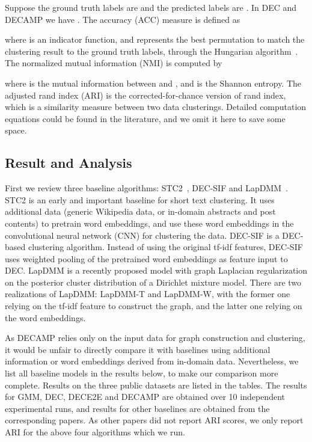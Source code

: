 \documentclass[letterpaper]{article}
\begin{document}
Suppose the ground truth labels are  and the predicted labels are . In DEC and DECAMP we have . The accuracy (ACC) measure is defined as

where  is an indicator function, and  represents the best  permutation to match the clustering result to the ground truth labels, through the Hungarian algorithm~\cite{papadi}. The normalized mutual information (NMI) is computed by

where  is the mutual information between  and , and  is the Shannon entropy. The adjusted rand index (ARI) is the corrected-for-chance version of rand index, which is a similarity measure between two data clusterings. Detailed computation equations could be found in the literature, and we omit it here to save some space. 

\subsection{Result and Analysis}
First we review three baseline algorithms: STC2~\cite{stc2}, DEC-SIF\cite{acl} and LapDMM~\cite{lapdmm}. STC2 is an early and important baseline for short text clustering. It uses additional data (generic Wikipedia data, or in-domain abstracts and post contents) to pretrain word embeddings, and use these word embeddings in the convolutional neural network (CNN) for clustering the data. DEC-SIF is a DEC-based clustering algorithm. Instead of using the original tf-idf features, DEC-SIF uses weighted pooling of the pretrained word embeddings as feature input to DEC. LapDMM is a recently proposed model with graph Laplacian regularization on the posterior cluster distribution of a Dirichlet mixture model. There are two realizations of LapDMM: LapDMM-T and LapDMM-W, with the former one relying on the tf-idf feature to construct the graph, and the latter one relying on the word embeddings.

As DECAMP relies only on the input data for graph construction and clustering, it would be unfair to directly compare it with baselines using additional information or word embeddings derived from in-domain data. Nevertheless, we list all baseline models in the results below, to make our comparison more complete. Results on the three public datasets are listed in the tables. The results for GMM, DEC, DECE2E and DECAMP are obtained over 10 independent experimental runs, and results for other baselines are obtained from the corresponding papers. As other papers did not report ARI scores, we only report ARI for the above four algorithms which we run.
\end{document}
